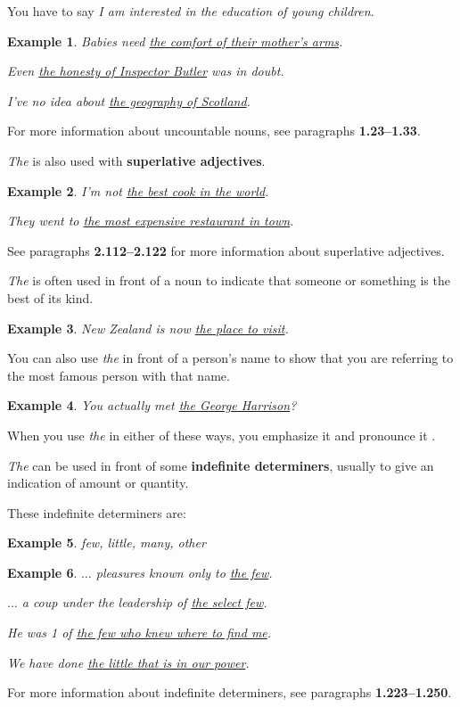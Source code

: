 \documentclass[oneside]{book}
\numberwithin{equation}{section}
\newtheorem{example}{Example}[section]
\begin{document}
You have to say \textit{I am interested in the education of young children}.
\begin{example}
    Babies need \underline{the comfort of their mother's arms}.
    
    Even \underline{the honesty of Inspector Butler} was in doubt.
    
    I've no idea about \underline{the geography of Scotland}.
\end{example}
For more information about uncountable nouns, see paragraphs \textbf{1.23--1.33}.

%
\noindent{} \textit{The} is also used with \textbf{superlative adjectives}.
\begin{example}
    I'm not \underline{the best cook in the world}.
    
    They went to \underline{the most expensive restaurant in town}.
\end{example}
See paragraphs \textbf{2.112--2.122} for more information about superlative adjectives.

%
\noindent{} \textit{The} is often used in front of a noun to indicate that someone or something is the best of its kind.
\begin{example}
    New Zealand is now \underline{the place to visit}.
\end{example}
You can also use \textit{the} in front of a person's name to show that you are referring to the most famous person with that name.
\begin{example}
    You actually met \underline{the George Harrison}?
\end{example}
When you use \textit{the} in either of these ways, you emphasize it and pronounce it .

%
\noindent{} \textit{The} can be used in front of some \textbf{indefinite determiners}, usually to give an indication of amount or quantity.

%
These indefinite determiners are:
\begin{example}
    few, little, many, other
\end{example}

\begin{example}
    $\ldots$ pleasures known only to \underline{the few}.
    
    $\ldots$ a coup under the leadership of \underline{the select few}.
    
    He was 1 of \underline{the few who knew where to find me}.
    
    We have done \underline{the little that is in our power}.
\end{example}
For more information about indefinite determiners, see paragraphs \textbf{1.223--1.250}.
\end{document}
